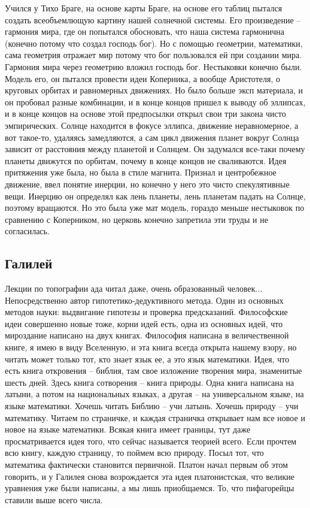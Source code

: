 \documentclass[a4paper, 12pt]{article}
\begin{document}
Учился у Тихо Браге, на основе карты Браге, на основе его таблиц пытался 
создать всеобъемлющую картину нашей солнечной системы. Его произведение 
-- гармония мира, где он попытался обосновать, что наша система 
гармонична (конечно потому что создал господь бог). Но с помощью 
геометрии, математики, сама геометрия отражает мир потому что бог 
пользовался ей при создании мира. Гармония мира через геометрию вложил 
господь бог. Нестыковки конечно были. Модель его, он пытался провести 
идеи Коперника, а вообще Аристотеля, о круговых орбитах и равномерных 
движениях. Но было больше эксп материала, и он пробовал разные 
комбинации, и в конце концов пришел к выводу об эллипсах, и в конце 
концов на основе этой предпосылки открыл свои три закона чисто 
эмпирических. Солнце находится в фокусе эллипса, движение неравномерное, 
а вот такое-то, удаляясь замедляются, а сам цикл движения планет вокруг 
Солнца зависит от расстояния между планетой и Солнцем. Он задумался 
все-таки почему планеты движутся по орбитам, почему в конце концов не 
сваливаются. Идея притяжения уже была, но была в стиле магнита. Признал 
и центробежное движение, ввел понятие инерции, но конечно у него это 
чисто спекулятивные вещи. Инерцию он определял как лень планеты, лень 
планетам падать на Солнце, поэтому вращаются. Но это была уже мат 
модель, гораздо меньше нестыковок по сравнению с Коперником, но церковь 
конечно запретила эти труды и не согласилась.


\subsection{Галилей}

Лекции по топографии ада читал даже, очень образованный человек... 
Непосредственно автор гипотетико-дедуктивного метода. Один из основных 
методов науки: выдвигание гипотезы и проверка предсказаний. Философские 
идеи совершенно новые тоже, корни идей есть, одна из основных идей, что 
мироздание написано на двух книгах. Философия написана в величественной 
книге, я имею в виду Вселенную, и эта книга всегда открыта нашему взору, 
но читать может только тот, кто знает язык ее, а это язык математики. 
Идея, что есть книга откровения -- библия, там свое изложение творения 
мира, знаменитые шесть дней. Здесь книга сотворения -- книга природы. 
Одна книга написана на латыни, а потом на национальных языках, а другая 
-- на универсальном языке, на языке математики. Хочешь читать Библию -- 
учи латынь. Хочешь природу -- учи математику. Читаем по страничке, 
и каждая страничка открывает нам все новое и новое на языке математики. 
Всякая книга имеет границы, тут даже просматривается идея того, что 
сейчас называется теорией всего. Если прочтем всю книгу, каждую 
страницу, то поймем всю природу. Посыл тот, что математика фактически 
становится первичной. Платон начал первым об этом говорить, и у Галилея 
снова возрождается эта идея платонистская, что великие уравнения уже 
были написаны, а мы лишь приобщаемся. То, что пифагорейцы ставили выше 
всего числа.
\end{document}
